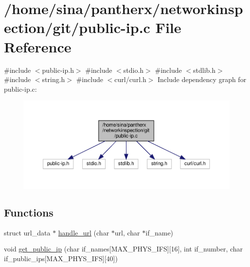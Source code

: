 \hypertarget{public-ip_8c}{}\section{/home/sina/pantherx/networkinspection/git/public-\/ip.c File Reference}
\label{public-ip_8c}
{\ttfamily \#include $<$public-\/ip.\+h$>$}\newline
{\ttfamily \#include $<$stdio.\+h$>$}\newline
{\ttfamily \#include $<$stdlib.\+h$>$}\newline
{\ttfamily \#include $<$string.\+h$>$}\newline
{\ttfamily \#include $<$curl/curl.\+h$>$}\newline
Include dependency graph for public-\/ip.c\+:\nopagebreak
\begin{figure}[H]
\begin{center}
\leavevmode
\includegraphics[width=350pt]{public-ip_8c__incl}
\end{center}
\end{figure}
\subsection*{Functions}
\begin{DoxyCompactItemize}
\item 
struct url\+\_\+data $\ast$ \hyperlink{public-ip_8c_a546e9ee82a2fff0c37e173d76ab08db4}{handle\+\_\+url} (char $\ast$url, char $\ast$if\+\_\+name)
\item 
void \hyperlink{public-ip_8c_a343631cf6f2ceb1736d8b227c2cf76d3}{get\+\_\+public\+\_\+ip} (char if\+\_\+names\mbox{[}M\+A\+X\+\_\+\+P\+H\+Y\+S\+\_\+\+I\+FS\mbox{]}\mbox{[}16\mbox{]}, int if\+\_\+number, char if\+\_\+public\+\_\+ips\mbox{[}M\+A\+X\+\_\+\+P\+H\+Y\+S\+\_\+\+I\+FS\mbox{]}\mbox{[}40\mbox{]})
\end{DoxyCompactItemize}


